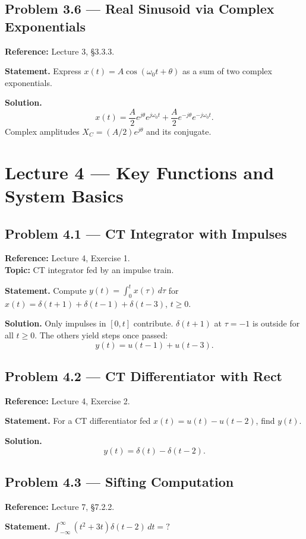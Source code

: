 \documentclass[11pt]{article}
\begin{document}
\subsection{Problem 3.6 --- Real Sinusoid via Complex Exponentials}
\textbf{Reference:} Lecture 3, \S 3.3.3.

\textbf{Statement.} Express $x(t)=A\cos(\omega_0 t + \theta)$ as a sum of two complex exponentials.

\textbf{Solution.}
\[
x(t) = \frac{A}{2}e^{j\theta}e^{j\omega_0 t}+\frac{A}{2}e^{-j\theta}e^{-j\omega_0 t}.
\]
Complex amplitudes $X_C = (A/2)e^{j\theta}$ and its conjugate.

\section{Lecture 4 --- Key Functions and System Basics}

\subsection{Problem 4.1 --- CT Integrator with Impulses}
\textbf{Reference:} Lecture 4, Exercise 1.\\
\textbf{Topic:} CT integrator fed by an impulse train.

\textbf{Statement.} Compute $y(t)=\int_0^t x(\tau)\,d\tau$ for $x(t)=\delta(t+1)+\delta(t-1)+\delta(t-3)$, $t\ge 0$.

\textbf{Solution.} Only impulses in $[0,t]$ contribute. $\delta(t+1)$ at $\tau=-1$ is outside for all $t\ge 0$. The others yield steps once passed:
\[
y(t) = u(t-1) + u(t-3).
\]

\subsection{Problem 4.2 --- CT Differentiator with Rect}
\textbf{Reference:} Lecture 4, Exercise 2.

\textbf{Statement.} For a CT differentiator fed $x(t)=u(t)-u(t-2)$, find $y(t)$.

\textbf{Solution.}
\[
y(t) = \delta(t) - \delta(t-2).
\]

\subsection{Problem 4.3 --- Sifting Computation}
\textbf{Reference:} Lecture 7, \S 7.2.2.

\textbf{Statement.} $\displaystyle\int_{-\infty}^\infty (t^2+3t)\delta(t-2)\,dt = ?$
\end{document}
